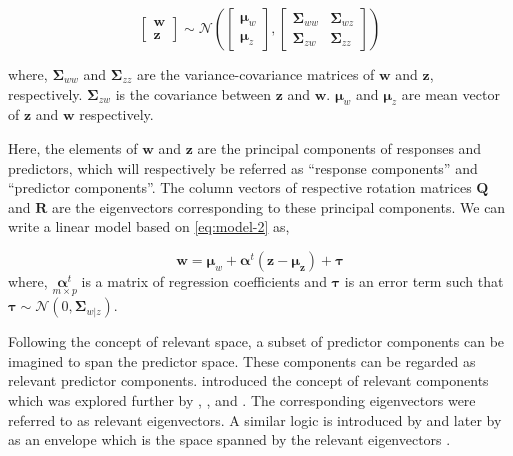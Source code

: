 \documentclass[12pt,3p,authoryear]{elsarticle}
\begin{document}
\begin{equation}
  \begin{bmatrix}
    \mathbf{w} \\ \mathbf{z}
  \end{bmatrix} \sim \mathcal{N}
  \left(
    \begin{bmatrix}
      \boldsymbol{\mu}_w \\
      \boldsymbol{\mu}_z
    \end{bmatrix},
    \begin{bmatrix}
    \boldsymbol{\Sigma}_{ww} & \boldsymbol{\Sigma}_{wz} \\
    \boldsymbol{\Sigma}_{zw} & \boldsymbol{\Sigma}_{zz}
    \end{bmatrix}
  \right)
  \label{eq:model-2}
\end{equation}

where, \(\boldsymbol{\Sigma}_{ww}\) and \(\boldsymbol{\Sigma}_{zz}\) are
the variance-covariance matrices of \(\mathbf{w}\) and \(\mathbf{z}\),
respectively. \(\boldsymbol{\Sigma}_{zw}\) is the covariance between
\(\mathbf{z}\) and \(\mathbf{w}\). \(\boldsymbol{\mu}_w\) and
\(\boldsymbol{\mu}_z\) are mean vector of \(\mathbf{z}\) and
\(\mathbf{w}\) respectively.

Here, the elements of \(\mathbf{w}\) and \(\mathbf{z}\) are the
principal components of responses and predictors, which will
respectively be referred as ``response components'' and ``predictor
components''. The column vectors of respective rotation matrices
\(\mathbf{Q}\) and \(\mathbf{R}\) are the eigenvectors corresponding to
these principal components. We can write a linear model based on
\eqref{eq:model-2} as,

\begin{equation}
\mathbf{w} = \boldsymbol{\mu}_w + \boldsymbol{\alpha}^t(\mathbf{z} - \boldsymbol{\mu_z}) + \boldsymbol{\tau}
\label{eq:reg-model-2}
\end{equation} where, \(\underset{m\times p}{\boldsymbol{\alpha}^t}\) is
a matrix of regression coefficients and \(\boldsymbol{\tau}\) is an
error term such that
\(\boldsymbol{\tau} \sim \mathcal{N}(0, \boldsymbol{\Sigma}_{w|z})\).

Following the concept of relevant space, a subset of predictor
components can be imagined to span the predictor space. These components
can be regarded as relevant predictor components. \citet{Naes1985}
introduced the concept of relevant components which was explored further
by \citet{helland1990partial}, \citet{naes1993relevant},
\citet{Helland1994b} and \citet{Helland2000}. The corresponding
eigenvectors were referred to as relevant eigenvectors. A similar logic
is introduced by \citet{cook2010envelope} and later by
\citet{cook2013envelopes} as an envelope which is the space spanned by
the relevant eigenvectors \citep[pp.~101]{cook2018envelope}.
\end{document}
